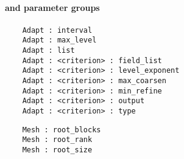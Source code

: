 \NEWSEC

\subsection{\ssParamRefine}

\begin{frame}[fragile,label=ss-param-refine] 
\secframetitle{\ssParamRefine}
\framesubtitle{ and  parameter groups}

\begin{verbatim}
    Adapt : interval
    Adapt : max_level
    Adapt : list
    Adapt : <criterion> : field_list
    Adapt : <criterion> : level_exponent
    Adapt : <criterion> : max_coarsen
    Adapt : <criterion> : min_refine
    Adapt : <criterion> : output
    Adapt : <criterion> : type
\end{verbatim}

\begin{verbatim}
    Mesh : root_blocks
    Mesh : root_rank
    Mesh : root_size
\end{verbatim}

\end{frame}

